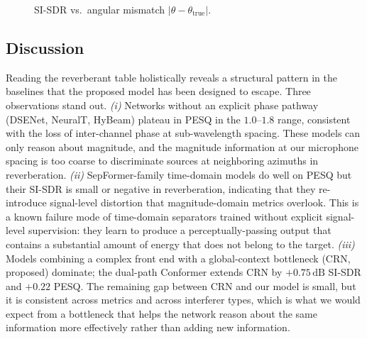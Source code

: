 \documentclass[journal,10pt]{IEEEtran}
\begin{document}
\begin{figure}[!t]
\centering
{}
\caption{SI-SDR vs.\ angular mismatch \(|\theta-\theta_{\mathrm{true}}|\).}
\label{fig:angerr}
\end{figure}

\subsection{Discussion}
Reading the reverberant table holistically reveals a structural pattern in the baselines that the proposed model has been designed to escape. Three observations stand out. \emph{(i)} Networks without an explicit phase pathway (DSENet, NeuralT, HyBeam) plateau in PESQ in the \(1.0\)--\(1.8\) range, consistent with the loss of inter-channel phase at sub-wavelength spacing. These models can only reason about magnitude, and the magnitude information at our microphone spacing is too coarse to discriminate sources at neighboring azimuths in reverberation. \emph{(ii)} SepFormer-family time-domain models do well on PESQ but their SI-SDR is small or negative in reverberation, indicating that they re-introduce signal-level distortion that magnitude-domain metrics overlook. This is a known failure mode of time-domain separators trained without explicit signal-level supervision: they learn to produce a perceptually-passing output that contains a substantial amount of energy that does not belong to the target. \emph{(iii)} Models combining a complex front end with a global-context bottleneck (CRN, proposed) dominate; the dual-path Conformer extends CRN by \(+0.75\,\mathrm{dB}\) SI-SDR and \(+0.22\) PESQ. The remaining gap between CRN and our model is small, but it is consistent across metrics and across interferer types, which is what we would expect from a bottleneck that helps the network reason about the same information more effectively rather than adding new information.
\end{document}
